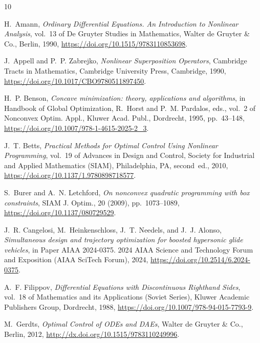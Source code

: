 \documentclass[onefignum,onetabnum]{siamart220329}
\numberwithin{equation}{section}
\begin{document}
%
%
\begin{thebibliography}{10}

{\sc H.~Amann}, {\em Ordinary Differential Equations. {A}n Introduction to
  Nonlinear Analysis}, vol.~13 of De Gruyter Studies in Mathematics, Walter de
  Gruyter \& Co., Berlin, 1990, 
  \url{https://doi.org/10.1515/9783110853698}.

{\sc J.~Appell and P.~P. Zabrejko}, {\em Nonlinear Superposition Operators},
  Cambridge Tracts in Mathematics, Cambridge University Press, Cambridge, 1990,
  \url{https://doi.org/10.1017/CBO9780511897450}.

{\sc H.~P. Benson}, {\em Concave minimization: theory, applications and
  algorithms}, in Handbook of Global Optimization, R.~Horst and P.~M. Pardalos,
  eds., vol.~2 of Nonconvex Optim. Appl., Kluwer Acad. Publ., Dordrecht, 1995,
  pp.~43--148,
  \url{https://doi.org/10.1007/978-1-4615-2025-2_3}.

{\sc J.~T. Betts}, {\em Practical Methods for Optimal Control Using Nonlinear
  Programming}, vol.~19 of Advances in Design and Control, Society for
  Industrial and Applied Mathematics (SIAM), Philadelphia, PA, second~ed.,
  2010,
  \url{https://doi.org/10.1137/1.9780898718577}.

{\sc S.~Burer and A.~N. Letchford}, {\em On nonconvex quadratic programming
  with box constraints}, SIAM J. Optim., 20 (2009), pp.~1073--1089,
  \url{https://doi.org/10.1137/080729529}.

{\sc J.~R. Cangelosi, M.~Heinkenschloss, J.~T. Needels, and J.~J. Alonso}, {\em
  Simultaneous design and trajectory optimization for boosted hypersonic glide
  vehicles}, in Paper AIAA 2024-0375. 2024 AIAA Science and Technology Forum
  and Exposition (AIAA SciTech Forum), 2024,
  \url{https://doi.org/10.2514/6.2024-0375}.

{\sc A.~F. Filippov}, {\em Differential Equations with Discontinuous Righthand
  Sides}, vol.~18 of Mathematics and its Applications (Soviet Series), Kluwer
  Academic Publishers Group, Dordrecht, 1988,
  \url{https://doi.org/10.1007/978-94-015-7793-9}.

{\sc M.~Gerdts}, {\em Optimal Control of {ODE}s and {DAE}s}, Walter de Gruyter \& Co., Berlin, 2012,
  \url{http://dx.doi.org/10.1515/9783110249996}.


\end{thebibliography}
\end{document}
